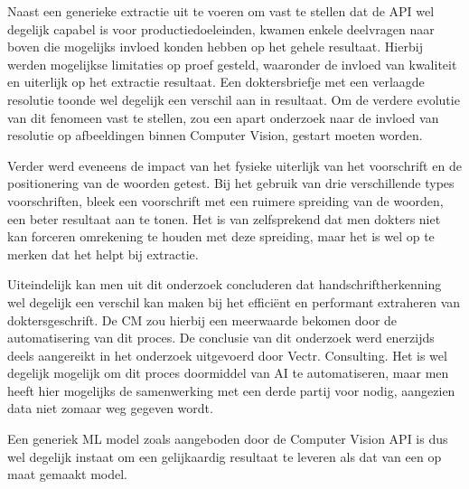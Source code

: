Naast een generieke extractie uit te voeren om vast te stellen dat de API wel degelijk capabel is voor productiedoeleinden, kwamen enkele deelvragen naar boven die mogelijks invloed konden hebben op het gehele resultaat. Hierbij werden mogelijkse limitaties op proef gesteld, waaronder de invloed van kwaliteit en uiterlijk op het extractie resultaat. Een doktersbriefje met een verlaagde resolutie toonde wel degelijk een verschil aan in resultaat. Om de verdere evolutie van dit fenomeen vast te stellen, zou een apart onderzoek naar de invloed van resolutie op afbeeldingen binnen Computer Vision, gestart moeten worden. 



Verder werd eveneens de impact van het fysieke uiterlijk van het voorschrift en de positionering van de woorden getest. Bij het gebruik van drie verschillende types voorschriften, bleek een voorschrift met een ruimere spreiding van de woorden, een beter resultaat aan te tonen. Het is van zelfsprekend dat men dokters niet kan forceren omrekening te houden met deze spreiding, maar het is wel op te merken dat het helpt bij extractie. 



Uiteindelijk kan men uit dit onderzoek concluderen dat handschriftherkenning wel degelijk een verschil kan maken bij het efficiënt en performant extraheren van doktersgeschrift. De CM zou hierbij een meerwaarde bekomen door de automatisering van dit proces. De conclusie van dit onderzoek werd enerzijds deels aangereikt in het onderzoek uitgevoerd door Vectr. Consulting. Het is wel degelijk mogelijk om dit proces doormiddel van AI te automatiseren, maar men heeft hier mogelijks de samenwerking met een derde partij voor nodig, aangezien data niet zomaar weg gegeven wordt. 





Een generiek ML model zoals aangeboden door de Computer Vision API is dus wel degelijk instaat om een gelijkaardig resultaat te leveren als dat van een op maat gemaakt model. 

